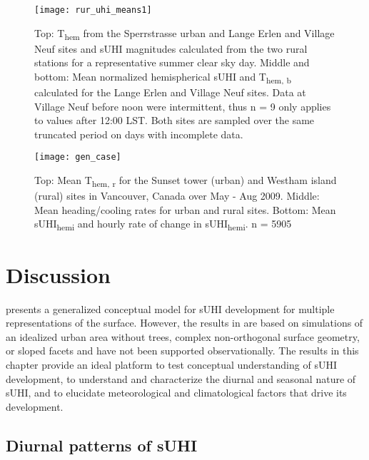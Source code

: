 \begin{bibunit}
\begin{figure}[H]
	\centering
	\texttt{[image: rur\_uhi\_means1]}
	\caption{Top: T\textsubscript{hem} from the Sperrstrasse urban and Lange Erlen and Village Neuf sites and sUHI magnitudes calculated from the two rural stations for a representative summer clear sky day. Middle and bottom: Mean normalized hemispherical sUHI and T\textsubscript{hem, b} calculated for the Lange Erlen and Village Neuf sites. Data at Village Neuf before noon were intermittent, thus n = 9 only applies to values after 12:00 LST. Both sites are sampled over the same truncated period on days with incomplete data.}
	\label{rur_uhi_means}
\end{figure}

\begin{figure}[H]
	\centering
	\texttt{[image: gen\_case]}
	\caption{Top: Mean T\textsubscript{hem, r} for the Sunset tower (urban) and Westham island (rural) sites in Vancouver, Canada over May - Aug 2009. Middle: Mean heading/cooling rates for urban and rural sites. Bottom: Mean sUHI\textsubscript{hemi} and hourly rate of change in sUHI\textsubscript{hemi}.  n = 5905}
	\label{gen_case}
\end{figure}

\section{Discussion}
\citet{Oke2017} presents a generalized conceptual model for sUHI development for multiple representations of the surface. However, the results in \citet{Oke2017} are based on simulations of an idealized urban area without trees, complex non-orthogonal surface geometry, or sloped facets and have not been supported observationally. The results in this chapter provide an ideal platform to test conceptual understanding of sUHI development, to understand and characterize the diurnal and seasonal nature of sUHI, and to elucidate meteorological and climatological factors that drive its development.

\subsection{Diurnal patterns of sUHI}
\label{gen}


\end{bibunit}

